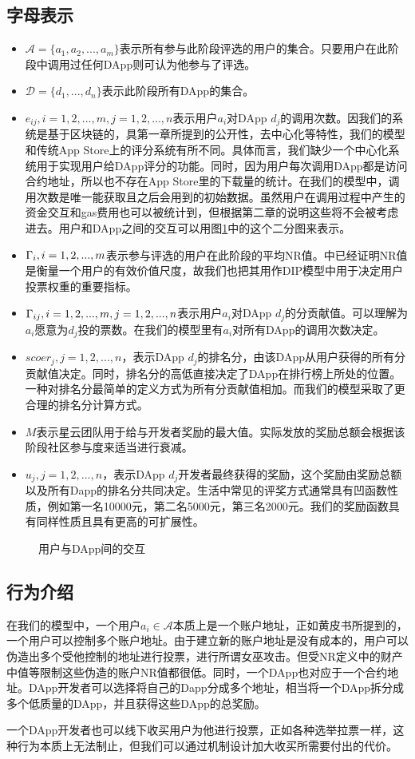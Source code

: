 \subsection{字母表示}
\begin{itemize}
	\item $\mathcal{A}=\{a_1,a_2,...,a_m\}$表示所有参与此阶段评选的用户的集合。只要用户在此阶段中调用过任何DApp则可认为他参与了评选。
	\item $\mathcal{D}=\{d_1,...,d_n\}$表示此阶段所有DApp的集合。
	\item $e_{ij},i=1,2,...,m, j=1,2,...,n$表示用户$a_i$对DApp $d_j$的调用次数。因我们的系统是基于区块链的，具第一章所提到的公开性，去中心化等特性，我们的模型和传统App Store上的评分系统有所不同。具体而言，我们缺少一个中心化系统用于实现用户给DApp评分的功能。同时，因为用户每次调用DApp都是访问合约地址，所以也不存在App Store里的下载量的统计。在我们的模型中，调用次数是唯一能获取且之后会用到的初始数据。虽然用户在调用过程中产生的资金交互和gas费用也可以被统计到，但根据第二章的说明这些将不会被考虑进去。用户和DApp之间的交互可以用图\ref{fig:interact}中的这个二分图来表示。
	\item $\Gamma_i, i=1,2,...,m$表示参与评选的用户在此阶段的平均NR值。\cite{Nabulasyellowpaper}中已经证明NR值是衡量一个用户的有效价值尺度，故我们也把其用作DIP模型中用于决定用户投票权重的重要指标。
	\item $\Gamma_{ij}, i=1,2,...,m,j=1,2,...,n$表示用户$a_i$对DApp $d_j$的分贡献值。可以理解为$a_i$愿意为$d_j$投的票数。在我们的模型里有$a_i$对所有DApp的调用次数决定。
	\item $scoer_j, j=1,2,...,n$，表示DApp $d_j$的排名分，由该DApp从用户获得的所有分贡献值决定。同时，排名分的高低直接决定了DApp在排行榜上所处的位置。一种对排名分最简单的定义方式为所有分贡献值相加。而我们的模型采取了更合理的排名分计算方式。
	\item $M$表示星云团队用于给与开发者奖励的最大值。实际发放的奖励总额会根据该阶段社区参与度来适当进行衰减。
	\item $u_j, j=1,2,...,n$，表示DApp $d_j$开发者最终获得的奖励，这个奖励由奖励总额以及所有Dapp的排名分共同决定。生活中常见的评奖方式通常具有凹函数性质，例如第一名10000元，第二名5000元，第三名2000元。我们的奖励函数具有同样性质且具有更高的可扩展性。
\end{itemize}

\begin{figure}
	\centering
  
\caption{用户与DApp间的交互 \label{fig:interact}}
\end{figure}
\subsection{行为介绍}
在我们的模型中，一个用户$a_i \in \mathcal{A}$本质上是一个账户地址，正如黄皮书所提到的，一个用户可以控制多个账户地址。由于建立新的账户地址是没有成本的，用户可以伪造出多个受他控制的地址进行投票，进行所谓女巫攻击。但受NR定义中的财产中值等限制这些伪造的账户NR值都很低。同时，一个DApp也对应于一个合约地址。DApp开发者可以选择将自己的Dapp分成多个地址，相当将一个DApp拆分成多个低质量的DApp，并且获得这些DApp的总奖励。

一个DApp开发者也可以线下收买用户为他进行投票，正如各种选举拉票一样，这种行为本质上无法制止，但我们可以通过机制设计加大收买所需要付出的代价。
